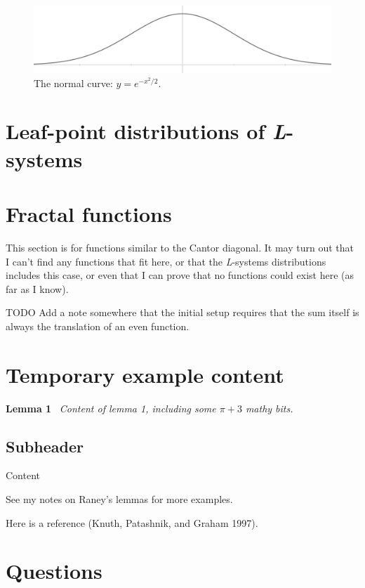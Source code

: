 \documentclass[]{article}
\begin{document}
\begin{figure}[htbp]
\centering
\includegraphics{images/pdfs/normal3.pdf}
\caption{The normal curve: \(y=e^{-x^2/2}\).}
\end{figure}

\section{\texorpdfstring{Leaf-point distributions of
\emph{L}-systems}{Leaf-point distributions of L-systems}}\label{leaf-point-distributions-of-l-systems}

\section{Fractal functions}\label{fractal-functions}

This section is for functions similar to the Cantor diagonal. It may
turn out that I can't find any functions that fit here, or that the
\emph{L}-systems distributions includes this case, or even that I can
prove that no functions could exist here (as far as I know).

TODO Add a note somewhere that the initial setup requires that the sum
itself is always the translation of an even function.

\section{Temporary example content}\label{temporary-example-content}

\textbf{Lemma 1}~ \emph{Content of lemma 1, including some \(\pi+3\)
mathy bits.}

\subsection{Subheader}\label{subheader}

Content

See my notes on Raney's lemmas for more examples.

Here is a reference (Knuth, Patashnik, and Graham 1997).

\section{Questions}\label{questions}
\end{document}
